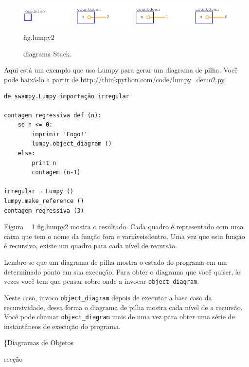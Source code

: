 \documentclass[10pt]{book}
\begin{document}
\begin{exercise}
\begin{v erbatim}
{\begin{figure}
\centerline
{\includegraphics[scale = 0.7] {figs/lumpydemo2.pdf}}
\caption{diagrama Stack.}
\label{} fig.lumpy2
\end{figure}

Aqui está um exemplo que usa Lumpy para gerar um diagrama de pilha.
Você pode baixá-lo a partir de \url{http://thinkpython.com/code/lumpy_demo2.py}.
 

\begin{verbatim}
de swampy.Lumpy importação irregular

contagem regressiva def (n):
    se n <= 0:
        imprimir 'Fogo!'
        lumpy.object_diagram ()
    else:
        print n
        contagem (n-1)

irregular = Lumpy ()
lumpy.make_reference ()
contagem regressiva (3)
\end{verbatim}

Figura ~ \ref {} fig.lumpy2 mostra o resultado. Cada quadro é representado
com uma caixa que tem o nome da função fora e variáveis ​​dentro.
Uma vez que esta função é recursivo, existe um quadro para cada
nível de recursão.

Lembre-se que um diagrama de pilha mostra o estado do programa em
um determinado ponto em sua execução. Para obter o diagrama que você quiser,
às vezes você tem que pensar sobre onde a invocar \verb "object_diagram".

Neste caso, invoco \verb "object_diagram" depois de executar a base
caso da recursividade, dessa forma o diagrama de pilha mostra cada nível de
a recursão. Você pode chamar \verb "object_diagram" mais de uma vez para
obter uma série de instantâneos de execução do programa.


\{Diagramas de Objetos} secção


\end{v erbatim}
\end{exercise}
\end{document}
